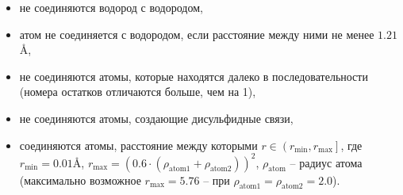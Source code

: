 \documentclass[14pt]{extarticle}
\begin{document}
\begin{itemize}
	\item не соединяются водород с водородом,
	\item атом не соединяется с водородом, если расстояние между ними не менее $1.21$\AA,
	\item не соединяются атомы, которые находятся далеко в последовательности (номера остатков отличаются больше, чем на 1),
	\item не соединяются атомы, создающие дисульфидные связи,
	\item соединяются атомы, расстояние между которыми $r\in \left(r_\text{min}, r_\text{max}\right]$, где $r_\text{min} = 0.01$\AA, $r_\text{max} = \left(0.6\cdot(\rho_\text{atom1}+\rho_\text{atom2})\right)^2$, $\rho_\text{atom}$ -- радиус атома (максимально возможное $r_\text{max} = 5.76$ -- при $\rho_\text{atom1} = \rho_\text{atom2} = 2.0$).
\end{itemize}
\end{document}
